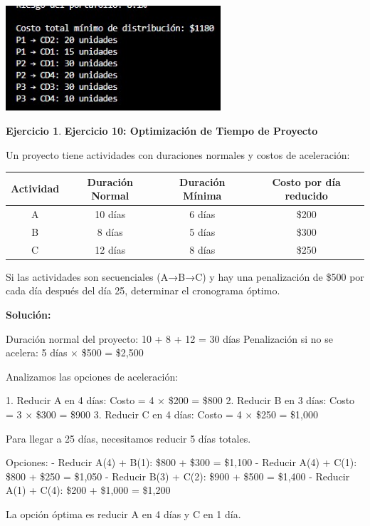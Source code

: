 \documentclass[12pt, a4paper, oneside]{book}
\theoremstyle{definition}
\newtheorem{ejercicio}{Ejercicio}[chapter]
\begin{document}
\begin{center}
\includegraphics[width=0.6\textwidth]{ejercicio9fm.png}
\end{center}

\begin{ejercicio}
\textbf{Ejercicio 10: Optimización de Tiempo de Proyecto}

Un proyecto tiene actividades con duraciones normales y costos de aceleración:

\begin{center}
\begin{tabular}{|c|c|c|c|}
\hline
Actividad & Duración Normal & Duración Mínima & Costo por día reducido \\
\hline
A & 10 días & 6 días & \$200 \\
B & 8 días & 5 días & \$300 \\
C & 12 días & 8 días & \$250 \\
\hline
\end{tabular}
\end{center}

Si las actividades son secuenciales (A→B→C) y hay una penalización de \$500 por cada día después del día 25, determinar el cronograma óptimo.
\end{ejercicio}

\textbf{Solución:}

Duración normal del proyecto: 10 + 8 + 12 = 30 días
Penalización si no se acelera: 5 días × \$500 = \$2,500

Analizamos las opciones de aceleración:

1. Reducir A en 4 días: Costo = 4 × \$200 = \$800
2. Reducir B en 3 días: Costo = 3 × \$300 = \$900
3. Reducir C en 4 días: Costo = 4 × \$250 = \$1,000

Para llegar a 25 días, necesitamos reducir 5 días totales.

Opciones:
- Reducir A(4) + B(1): \$800 + \$300 = \$1,100
- Reducir A(4) + C(1): \$800 + \$250 = \$1,050
- Reducir B(3) + C(2): \$900 + \$500 = \$1,400
- Reducir A(1) + C(4): \$200 + \$1,000 = \$1,200

La opción óptima es reducir A en 4 días y C en 1 día.
\end{document}
